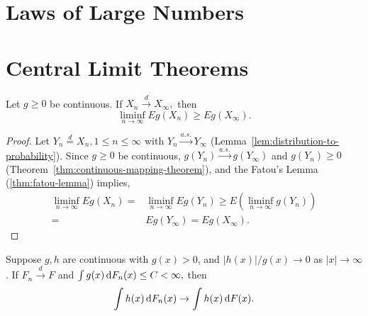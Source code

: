 \section{Laws of Large Numbers}

\section{Central Limit Theorems}

\begin{exercise}
	Let $g\geq 0$ be continuous. If $X_{n}\stackrel{d}{\rightarrow}X_{\infty},$ then
	\begin{equation*}
		\liminf_{n\rightarrow\infty}Eg\left(X_{n}\right)\geq Eg\left(X_{\infty}\right).
	\end{equation*}
	\label{ex:fatou-lemma-distribution}
\end{exercise}

\begin{proof}
	Let $Y_n\stackrel{d}{=}X_n,1\leq n\leq\infty$ with $Y_n\stackrel{a.s.}{\rightarrow}Y_\infty$ (Lemma~\ref{lem:distribution-to-probability}).
	Since $g\geq 0$ be continuous, $g(Y_n)\stackrel{a.s.}{\rightarrow}g(Y_\infty)$ and $g(Y_n)\geq 0$ (Theorem~\ref{thm:continuous-mapping-theorem}), and the Fatou's Lemma (\ref{thm:fatou-lemma}) implies,
	\begin{equation*}
		\begin{aligned}
			\liminf_{n\rightarrow\infty}Eg(X_n)= & \liminf_{n\rightarrow\infty}Eg(Y_n)\geq E\left(\liminf_{n\rightarrow\infty}g(Y_n)\right) \\
			=                                    & Eg(Y_\infty)=Eg(X_\infty).
		\end{aligned}
	\end{equation*}
\end{proof}

\begin{exercise}
	Suppose $g,h$ are continuous with $g(x)>0$, and $|h(x)|/g(x)\rightarrow 0$ as $|x|\rightarrow\infty$. If $F_{n}\stackrel{d}{\rightarrow}F$ and $\int g(x)\mathop{}\!\mathrm{d} F_{n}(x)\leq C<\infty,$ then
	\begin{equation*}
		\int h(x)\mathop{}\!\mathrm{d} F_{n}(x) \rightarrow \int h(x)\mathop{}\!\mathrm{d} F(x).
	\end{equation*}
\end{exercise}

